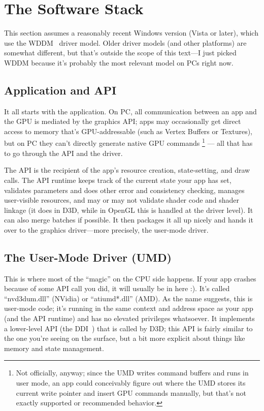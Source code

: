 \chapter{The Software Stack}
\label{ch:swstack}


This section assumes a reasonably recent Windows version (Vista or later),
which use the WDDM~\citep{wddm} driver model. Older driver models (and other
platforms) are somewhat different, but that's outside the scope of this
text---I just picked WDDM because it's probably the most relevant model on
PCs right now.

\section{Application and API}

It all starts with the application. On PC, all communication between an app and
the GPU is mediated by the graphics API; apps may occasionally get direct
access to memory that's GPU-addressable (such as Vertex Buffers or Textures),
but on PC they can't directly generate native GPU commands \footnote{Not
officially, anyway; since the UMD writes command buffers and runs in user mode,
an app could conceivably figure out where the UMD stores its current write
pointer and insert GPU commands manually, but that's not exactly supported or
recommended behavior.} --- all that has to go through the API and the driver.

The API is the recipient of the app's resource creation, state-setting, and draw
calls. The API runtime keeps track of the current state your app has set,
validates parameters and does other error and consistency checking, manages
user-visible resources, and may or may not validate shader code and shader
linkage (it does in D3D, while in OpenGL this is handled at the driver level).
It can also merge batches if possible. It then packages it all up nicely and
hands it over to the graphics driver---more precisely, the user-mode driver.

\section{The User-Mode Driver (UMD)}

This is where most of the ``magic'' on the CPU side happens. If your app
crashes because of some API call you did, it will usually be in here :). It's
called ``nvd3dum.dll'' (NVidia) or ``atiumd*.dll'' (AMD). As the name suggests,
this is user-mode code; it's running in the same context and address space as
your app (and the API runtime) and has no elevated privileges whatsoever. It
implements a lower-level API (the DDI~\citep{umd-ddi}) that is called by D3D;
this API is fairly similar to the one you're seeing on the surface, but a bit
more explicit about things like memory and state management.

